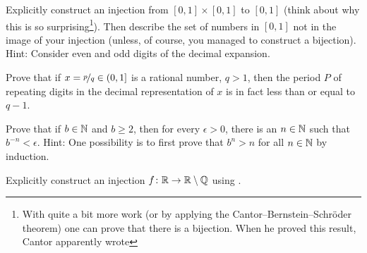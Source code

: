 \begin{exercise}[Challenging]
Explicitly construct an injection from $[0,1] \times [0,1]$ to $[0,1]$ (think about why
this is so surprising\footnote{%
With quite a bit more work (or by applying the
Cantor--Bernstein--Schr\"oder theorem)
one can prove that there is a bijection.
When he proved this result, Cantor apparently wrote
}).
Then describe the set of numbers in $[0,1]$ not in the image of your
injection (unless, of course, you managed to construct a bijection).
Hint: Consider even and odd digits of the decimal expansion.
\end{exercise}

\begin{exercise}
Prove that if $x = \nicefrac{p}{q} \in (0,1]$ is a rational number, $q > 1$,
then the period $P$ of repeating digits in the decimal representation
of $x$ is in fact less than or equal to $q-1$.
\end{exercise}

\begin{exercise} \label{exercise:bnlimit}
Prove that if $b \in {\mathbb{N}}$ and $b \geq 2$, then for every $\epsilon > 0$,
there is an $n \in {\mathbb{N}}$ such that
$b^{-n} < \epsilon$.  Hint:
One possibility is to first prove that $b^n > n$ for all $n \in {\mathbb{N}}$ by induction.
\end{exercise}

\begin{exercise}
Explicitly construct an injection $f \colon {\mathbb{R}} \to {\mathbb{R}} \setminus {\mathbb{Q}}$ using
.
\end{exercise}
